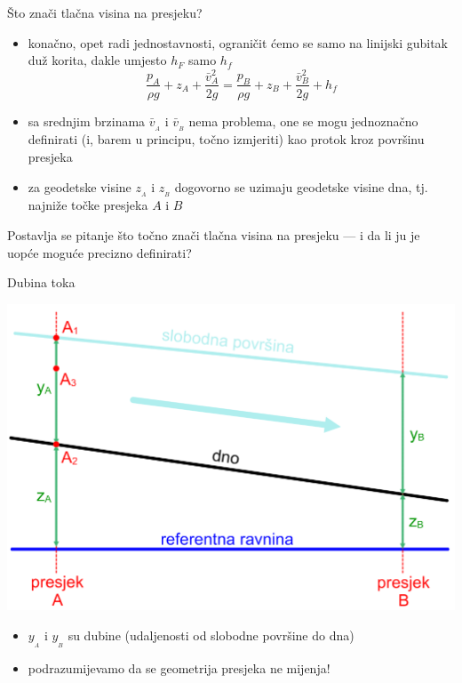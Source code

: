 \documentclass[croatian]{beamer}
\begin{document}
\begin{frame}{Što znači tlačna visina na presjeku?}

\begin{itemize}
\item konačno, opet radi jednostavnosti, ograničit ćemo se samo na linijski
gubitak duž korita, dakle umjesto $h_{F}$ samo $h_{f}$
\[
\frac{p_{{\scriptscriptstyle A}}}{\rho g}+z_{{\scriptscriptstyle A}}+\frac{\bar{v}_{{\scriptscriptstyle A}}^{2}}{2g}=\frac{p_{{\scriptscriptstyle B}}}{\rho g}+z_{{\scriptscriptstyle B}}+\frac{\bar{v}_{{\scriptscriptstyle B}}^{2}}{2g}+h_{f}
\]
\item sa srednjim brzinama $\bar{v}_{_{A}}$ i $\bar{v}_{_{B}}$ nema problema,
one se mogu jednoznačno definirati (i, barem u principu, točno izmjeriti)
kao protok kroz površinu presjeka
\item za geodetske visine $z_{_{A}}$ i $z_{_{B}}$ dogovorno se uzimaju
geodetske visine dna, tj. najniže točke presjeka $A$ i $B$
\end{itemize}
\begin{block}{}
Postavlja se pitanje što točno znači tlačna visina na presjeku ---
i da li ju je uopće moguće precizno definirati? 
\end{block}
\end{frame}

\begin{frame}{Dubina toka}

\begin{center}
\includegraphics[height=0.5\paperheight]{slike/MF-10-slika1.PNG}
\par\end{center}
\begin{itemize}
\item $y_{_{A}}$ i $y_{_{B}}$ su dubine (udaljenosti od slobodne površine
do dna)
\item podrazumijevamo da se geometrija presjeka ne mijenja!
\end{itemize}
\end{frame}
\end{document}
